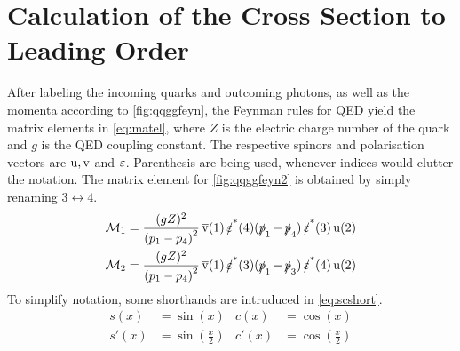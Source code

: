\section{Calculation of the Cross Section to Leading Order}%
\label{sec:qqggcalc}

After labeling the incoming quarks and outcoming photons, as well as
the momenta according to \cref{fig:qqggfeyn}, the Feynman rules for
QED yield the matrix elements in \cref{eq:matel}, where \(Z\) is the
electric charge number of the quark and \(g\) is the QED coupling
constant. The respective spinors and polarisation vectors are
\(\operatorname{u},\operatorname{v}\) and \(\operatorname{\varepsilon}\). Parenthesis are being used, whenever indices
would clutter the notation. The matrix element for
\cref{fig:qqggfeyn2} is obtained by simply renaming
\(3\leftrightarrow 4\).
%
\begin{align}
  \label{eq:matel}
  \mathcal{M}_1 &= \frac{(gZ)^2}{\qty(p_1 - p_4)^2}\vsb(1)\pses(4)(\ps_1 -
                \ps_4)\pses(3)\us(2)\\
  \mathcal{M}_2 &= \frac{(gZ)^2}{\qty(p_1 - p_4)^2}\vsb(1)\pses(3)(\ps_1 - \ps_3)\pses(4)\us(2)
\end{align}
%
To simplify notation, some shorthands are intruduced
in \cref{eq:scshort}.
\begin{equation}
  \label{eq:scshort}
  \begin{split}
    s(x) &= \sin(x) & c(x) &= \cos(x) \\ s'(x) &= \sin(\frac{x}{2}) & c'(x) &= \cos(\frac{x}{2})
  \end{split}
\end{equation}

